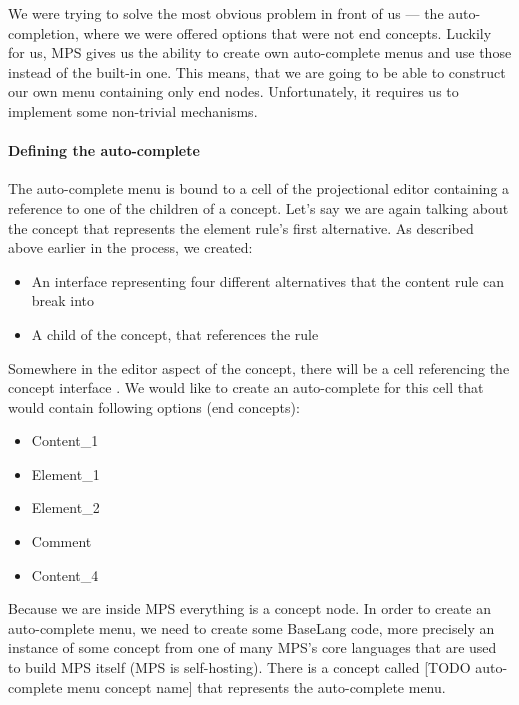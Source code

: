 We were trying to solve the most obvious problem in front of us --- the auto-completion, where we were offered options that were not end concepts. Luckily for us, MPS gives us the ability to create own auto-complete menus and use those instead of the built-in one. This means, that we are going to be able to construct our own menu containing only end nodes. Unfortunately, it requires us to implement some non-trivial mechanisms. 

\paragraph{Defining the auto-complete}

The auto-complete menu is bound to a cell of the projectional editor containing a reference to one of the children of a concept. Let's say we are again talking about the concept that represents the element rule's first alternative. As described above earlier in the process, we created:

\begin{itemize}
	\setlength\itemsep{0pt}
	
	\item An interface  representing four different alternatives that the content rule can break into
	
	\item A child of the  concept, that references the  rule
\end{itemize}
 
Somewhere in the editor aspect of the  concept, there will be a cell referencing the concept interface . We would like to create an auto-complete for this cell that would contain following options (end concepts):

\begin{itemize}
	\setlength\itemsep{0pt}
	\item Content{\_}1
	\item Element{\_}1
	\item Element{\_}2
	\item Comment
	\item Content{\_}4
\end{itemize}

Because we are inside MPS everything is a concept node. In order to create an auto-complete menu, we need to create some BaseLang code, more precisely an instance of some concept from one of many MPS's core languages that are used to build MPS itself (MPS is self-hosting). There is a concept called [TODO auto-complete menu concept name] that represents the auto-complete menu. 
\\

